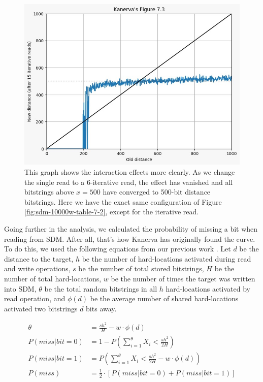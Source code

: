 \begin{figure}[h]
\centering\includegraphics[width=\textwidth]{images02/sdm-10000w-table-7-2-15iter.png}
\caption{This graph shows the interaction effects more clearly.  As we change the single read to a 6-iterative read, the effect has vanished and all bitstrings above $x=500$ have converged to 500-bit distance bitstrings. Here we have the exact same configuration of Figure \ref{fig:sdm-10000w-table-7-2}, except for the iterative read.
\label{fig:sdm-10000w-table-7-2-15iter}}
\end{figure}

Going further in the analysis, we calculated the probability of missing a bit when reading from SDM. After all, that's how Kanerva has originally found the curve. To do this, we used the following equations from our previous work \citep{brogliato2014sparse}. Let $d$ be the distance to the target, $h$ be the number of hard-locations activated during read and write operations, $s$ be the number of total stored bitstrings, $H$ be the number of total hard-locations, $w$ be the number of times the target was written into SDM, $\theta$ be the total random bitstrings in all $h$ hard-locations activated by read operation, and $\phi(d)$ be the average number of shared hard-locations activated two bitstrings $d$ bits away.

\begin{align}
\theta &= \frac{sh^2}{H} - w \cdot \phi(d) \\
P(miss | bit=0) &= 1 - P \left( \sum_{i=1}^\theta X_i < \frac{sh^2}{2H} \right) \\
P(miss | bit=1) &= P \left( \sum_{i=1}^\theta X_i < \frac{sh^2}{2H} - w \cdot \phi(d) \right) \\
P(miss) &= \frac{1}{2} \cdot \left[ P(miss | bit=0) + P(miss | bit=1) \right]
\end{align}

